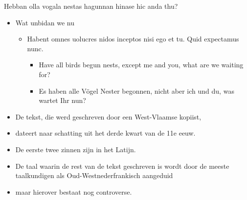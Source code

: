 \documentclass[department=none, notes={show notes}, slidesperpage=4, official=true, handout]{beamerruhuisstijl}
\begin{document}
\begin{frame}{Hebban olla vogala nestas hagunnan hinase hic anda thu?}
    \begin{itemize}
        \item Wat unbidan we nu
        \begin{itemize}
            \item Habent omnes uolucres nidos inceptos nisi ego et tu. Quid expectamus nunc.
            \begin{itemize}
                \item Have all birds begun nests, except me and you, what are we waiting for?
                \item Es haben alle V\"ogel Nester begonnen, nicht aber ich und du, was wartet Ihr nun? 
            \end{itemize}
        \end{itemize}
        \item De tekst, die werd geschreven door een West-Vlaamse kopiist,
        \item dateert naar schatting uit het derde kwart van de 11e eeuw.
        \item  De eerste twee zinnen zijn in het Latijn. 
        \item De taal waarin de rest van de tekst geschreven is wordt door de meeste taalkundigen als Oud-Westnederfrankisch aangeduid
        \item maar hierover bestaat nog controverse.
    \end{itemize}
\end{frame}
\end{document}
